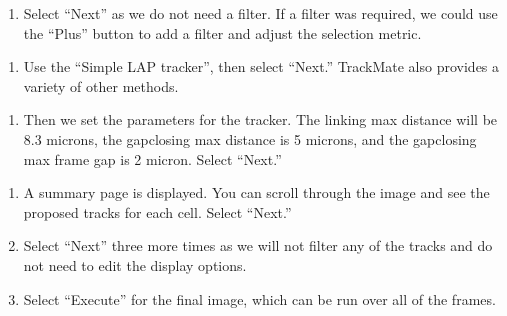 \documentclass[letterpaper,10pt,english]{jupyterBook}
\begin{document}
\sphinxAtStartPar
{}
\begin{enumerate}
%
\setcounter{enumi}{6}
\item {} 
\sphinxAtStartPar
Select “Next” as we do not need a filter. If a filter was required, we could use the “Plus” button to add a filter and adjust the selection metric.

\end{enumerate}

\sphinxAtStartPar
{}
\begin{enumerate}
%
\setcounter{enumi}{7}
\item {} 
\sphinxAtStartPar
Use the “Simple LAP tracker”, then select “Next.” TrackMate also provides a variety of other methods.

\end{enumerate}

\sphinxAtStartPar
{}
\begin{enumerate}
%
\setcounter{enumi}{8}
\item {} 
\sphinxAtStartPar
Then we set the parameters for the tracker. The linking max distance will be 8.3 microns, the gap\sphinxhyphen{}closing max distance is 5 microns, and the gap\sphinxhyphen{}closing max frame gap is 2 micron. Select “Next.”

\end{enumerate}

\sphinxAtStartPar
{}
\begin{enumerate}
%
\setcounter{enumi}{9}
\item {} 
\sphinxAtStartPar
A summary page is displayed. You can scroll through the image and see the proposed tracks for each cell. Select “Next.”

\item {} 
\sphinxAtStartPar
Select “Next” three more times as we will not filter any of the tracks and do not need to edit the display options.

\item {} 
\sphinxAtStartPar
Select “Execute” for the final image, which can be run over all of the frames.

\end{enumerate}
\end{document}
